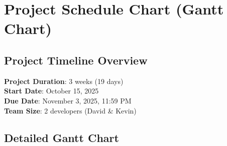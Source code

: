 \documentclass[11pt,a4paper]{article}
\begin{document}
\section{Project Schedule Chart (Gantt Chart)}

\subsection{Project Timeline Overview}

\textbf{Project Duration}: 3 weeks (19 days)\\
\textbf{Start Date}: October 15, 2025\\
\textbf{Due Date}: November 3, 2025, 11:59 PM\\
\textbf{Team Size}: 2 developers (David \& Kevin)

\subsection{Detailed Gantt Chart}
\end{document}
